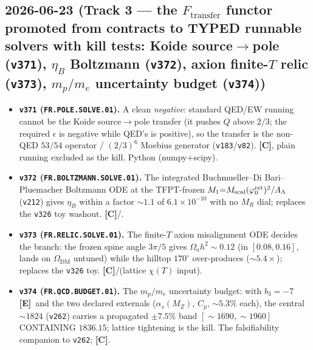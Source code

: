 \documentclass[11pt]{article}
\providecommand{\mE}{\textbf{[E]}}\providecommand{\mC}{\textbf{[C]}}
\providecommand{\vref}[1]{\texttt{#1}}
\begin{document}
\subsection*{2026-06-23 (Track 3 --- the $F_{\mathrm{transfer}}$ functor promoted from contracts to TYPED runnable solvers with kill tests: Koide source$\to$pole (\texttt{v371}), $\eta_B$ Boltzmann (\texttt{v372}), axion finite-$T$ relic (\texttt{v373}), $m_p/m_e$ uncertainty budget (\texttt{v374}))}
\begin{itemize}
\item \textbf{\texttt{v371} (\texttt{FR.POLE.SOLVE.01}).} A clean \emph{negative}: standard QED/EW running cannot
be the Koide source$\to$pole transfer (it pushes $Q$ above $2/3$; the required $\epsilon$ is negative while
QED's is positive), so the transfer is the non-QED $53/54$ operator / $(2/3)^6$ Moebius generator
(\vref{v183}/\vref{v82}). \mC, plain running excluded as the kill. Python (numpy$+$scipy).
\item \textbf{\texttt{v372} (\texttt{FR.BOLTZMANN.SOLVE.01}).} The integrated Buchmueller--Di Bari--Pluemacher
Boltzmann ODE at the TFPT-frozen $M_1{=}M_{\mathrm{scal}}(\varphi_0^{\mathrm{ret}})^2/A_\Lambda$ (\vref{v212}) gives $\eta_B$ within a
factor ${\sim}1.1$ of $6.1{\times}10^{-10}$ with no $M_R$ dial; replaces the \vref{v326} toy washout. \mC/\mX.
\item \textbf{\texttt{v373} (\texttt{FR.RELIC.SOLVE.01}).} The finite-$T$ axion misalignment ODE decides the
branch: the frozen spine angle $3\pi/5$ gives $\Omega_a h^2{\sim}0.12$ (in $[0.08,0.16]$, lands on
$\Omega_{\mathrm{DM}}$ untuned) while the hilltop $170^\circ$ over-produces (${\sim}5.4\times$); replaces the
\vref{v326} toy. \mC/\mX (lattice $\chi(T)$ input).
\item \textbf{\texttt{v374} (\texttt{FR.QCD.BUDGET.01}).} The $m_p/m_e$ uncertainty budget: with $b_3{=}-7$
\mE\ and the two declared externals ($\alpha_s(M_Z)$, $C_p$, ${\sim}5.3\%$ each), the central ${\sim}1824$
(\vref{v262}) carries a propagated ${\pm}7.5\%$ band $[\sim1690,\sim1960]$ CONTAINING $1836.15$; lattice
tightening is the kill. The falsifiability companion to \vref{v262}; \mC.
\end{itemize}
\end{document}
